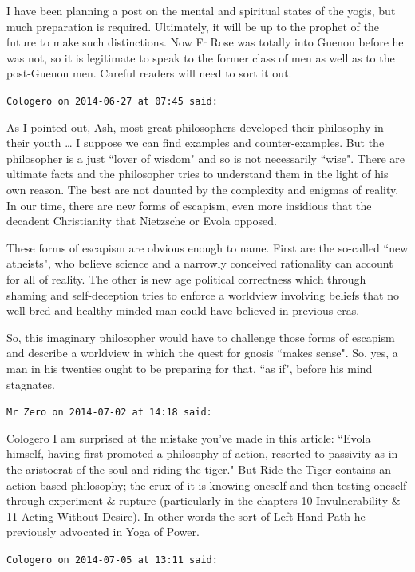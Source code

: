 \begin{footnotesize}
\begin{sffamily}
I have been planning a post on the mental and spiritual states of the yogis, but much preparation is required. Ultimately, it will be up to the prophet of the future to make such distinctions. Now Fr Rose was totally into Guenon before he was not, so it is legitimate to speak to the former class of men as well as to the post-Guenon men. Careful readers will need to sort it out.

\hfill

\texttt{Cologero on 2014-06-27 at 07:45 said: }

As I pointed out, Ash, most great philosophers developed their philosophy in their youth … I suppose we can find examples and counter-examples. But the philosopher is a just ``lover of wisdom" and so is not necessarily ``wise". There are ultimate facts and the philosopher tries to understand them in the light of his own reason. The best are not daunted by the complexity and enigmas of reality. In our time, there are new forms of escapism, even more insidious that the decadent Christianity that Nietzsche or Evola opposed.

These forms of escapism are obvious enough to name. First are the so-called ``new atheists", who believe science and a narrowly conceived rationality can account for all of reality. The other is new age political correctness which through shaming and self-deception tries to enforce a worldview involving beliefs that no well-bred and healthy-minded man could have believed in previous eras.

So, this imaginary philosopher would have to challenge those forms of escapism and describe a worldview in which the quest for gnosis ``makes sense". So, yes, a man in his twenties ought to be preparing for that, ``as if", before his mind stagnates.


\hfill

\texttt{Mr Zero on 2014-07-02 at 14:18 said: }

Cologero I am surprised at the mistake you've made in this article: ``Evola himself, having first promoted a philosophy of action, resorted to passivity as in the aristocrat of the soul and riding the tiger." But Ride the Tiger contains an action-based philosophy; the crux of it is knowing oneself and then testing oneself through experiment \& rupture (particularly in the chapters 10 Invulnerability \& 11 Acting Without Desire). In other words the sort of Left Hand Path he previously advocated in Yoga of Power.


\hfill

\texttt{Cologero on 2014-07-05 at 13:11 said: }


\end{sffamily}
\end{footnotesize}
